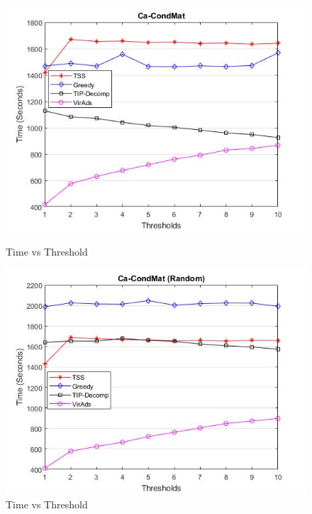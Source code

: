 \begin{figure}[h!]
\begin{minipage}[t]{0.50\textwidth}
\includegraphics[width=\linewidth,keepaspectratio=true]{images/ca-condmattime.jpg}
\caption{Time vs Threshold}

\end{minipage}
\begin{minipage}[t]{0.50\textwidth}
\includegraphics[width=\linewidth,keepaspectratio=true]{images/ca-condmatrandomtime.jpg}
\caption{Time vs Threshold}
\end{minipage}
\end{figure}

